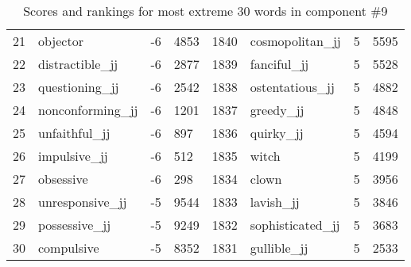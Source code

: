 \begin{table}[tbp]
\begin{tabular}{| rlr@{.}l | rlr@{.}l |}
    21 & objector & -6 & 4853    &    1840 & cosmopolitan\_jj & 5 & 5595 \\
    22 & distractible\_jj & -6 & 2877    &    1839 & fanciful\_jj & 5 & 5528 \\
    23 & questioning\_jj & -6 & 2542    &    1838 & ostentatious\_jj & 5 & 4882 \\
    24 & nonconforming\_jj & -6 & 1201    &    1837 & greedy\_jj & 5 & 4848 \\
    25 & unfaithful\_jj & -6 & 897    &    1836 & quirky\_jj & 5 & 4594 \\
    26 & impulsive\_jj & -6 & 512    &    1835 & witch & 5 & 4199 \\
    27 & obsessive & -6 & 298    &    1834 & clown & 5 & 3956 \\
    28 & unresponsive\_jj & -5 & 9544    &    1833 & lavish\_jj & 5 & 3846 \\
    29 & possessive\_jj & -5 & 9249    &    1832 & sophisticated\_jj & 5 & 3683 \\
    30 & compulsive & -5 & 8352    &    1831 & gullible\_jj & 5 & 2533 \\
    \hline
    \end{tabular}
    \caption{Scores and rankings for most extreme 30 words in component \#9} 
\end{table}
\clearpage
